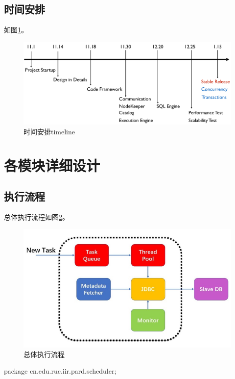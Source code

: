 \documentclass[a4paper, 12pt]{ctexart}
\begin{document}
\subsection{时间安排}
如图\ref{fig:tl}。

\begin{figure}[htbp]
	\centering
	\includegraphics[width=\linewidth]{figure/timeline.png}
	\caption{时间安排timeline}
	\label{fig:tl}
\end{figure}

\section{各模块详细设计}
\subsection{执行流程}

总体执行流程如图\ref{fig:exec-flow}。

\begin{figure}[htbp]
	\centering
	\includegraphics[width=\linewidth]{figure/exec-flow.png}
	\caption{总体执行流程}
	\label{fig:exec-flow}
\end{figure}


package cn.edu.ruc.iir.pard.scheduler;
\end{document}
